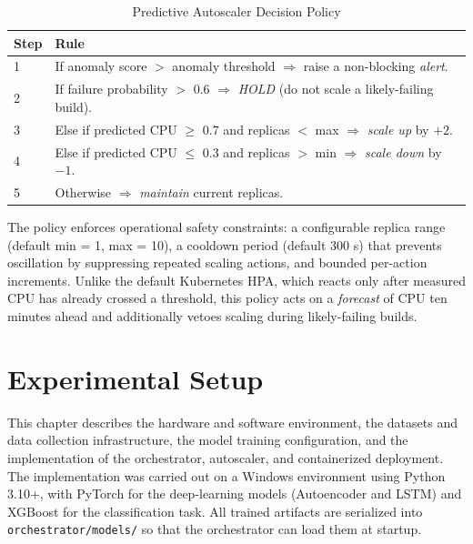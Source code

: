 \documentclass[a4paper,14pt,onecolumn]{report}
\begin{document}
\begin{table}[H]
\centering
\caption{Predictive Autoscaler Decision Policy}
\label{alg:autoscale}
\begin{tabular}{|p{1cm}|p{12.5cm}|}
\hline
\textbf{Step} & \textbf{Rule} \\
\hline
1 & If anomaly score $>$ anomaly threshold $\Rightarrow$ raise a non-blocking \emph{alert}. \\
\hline
2 & If failure probability $>$ 0.6 $\Rightarrow$ \emph{HOLD} (do not scale a likely-failing build). \\
\hline
3 & Else if predicted CPU $\geq$ 0.7 and replicas $<$ max $\Rightarrow$ \emph{scale up} by $+2$. \\
\hline
4 & Else if predicted CPU $\leq$ 0.3 and replicas $>$ min $\Rightarrow$ \emph{scale down} by $-1$. \\
\hline
5 & Otherwise $\Rightarrow$ \emph{maintain} current replicas. \\
\hline
\end{tabular}
\end{table}

The policy enforces operational safety constraints: a configurable replica range (default min = 1, max = 10), a cooldown period (default 300 s) that prevents oscillation by suppressing repeated scaling actions, and bounded per-action increments. Unlike the default Kubernetes HPA, which reacts only after measured CPU has already crossed a threshold, this policy acts on a \emph{forecast} of CPU ten minutes ahead and additionally vetoes scaling during likely-failing builds.

\chapter{Experimental Setup}

This chapter describes the hardware and software environment, the datasets and data collection infrastructure, the model training configuration, and the implementation of the orchestrator, autoscaler, and containerized deployment. The implementation was carried out on a Windows environment using Python 3.10+, with PyTorch for the deep-learning models (Autoencoder and LSTM) and XGBoost for the classification task. All trained artifacts are serialized into \texttt{orchestrator/models/} so that the orchestrator can load them at startup.
\end{document}
